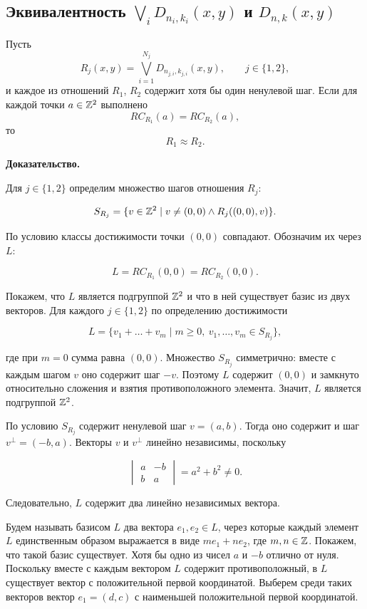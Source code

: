 \subsection{Эквивалентность $\bigvee \limits_{i} D_{n_i, k_i}(x,y)$ и $D_{n,k}(x,y)$}

\begin{namedLemma}
    \label{lemm:RCtoR}
    Пусть
    $$R_j(x,y)=\bigvee\limits_{i=1}^{N_j}D_{n_{j,i},k_{j,i}}(x,y),
    \qquad j\in\{1,2\},$$
    и каждое из отношений $R_1$, $R_2$ содержит хотя бы один ненулевой шаг.
    Если для каждой точки $a\in\mathbb{Z}^2$ выполнено
    $$RC_{R_1}(a)=RC_{R_2}(a),$$
    то
    $$R_1 \approx R_2.$$
\end{namedLemma}

\textbf{Доказательство.}

Для $j\in\{1,2\}$ определим множество шагов отношения $R_j$:

$$S_{R_j}=\{v\in\mathbb{Z}^2\mid v\ne(0,0)\land R_j((0,0),v)\}.$$

По условию классы достижимости точки $(0,0)$ совпадают. Обозначим их через
$L$:

$$L=RC_{R_1}(0,0)=RC_{R_2}(0,0).$$

Покажем, что $L$ является подгруппой $\mathbb{Z}^2$ и что в ней существует базис
из двух векторов. Для каждого $j\in\{1,2\}$ по определению достижимости

$$
L=
\{v_1+\dots+v_m\mid m\geq0,\ v_1,\dots,v_m\in S_{R_j}\},
$$

где при $m=0$ сумма равна $(0,0)$. Множество $S_{R_j}$ симметрично: вместе
с каждым шагом $v$ оно содержит шаг $-v$. Поэтому $L$ содержит $(0,0)$ и
замкнуто относительно сложения и взятия противоположного элемента. Значит,
$L$ является подгруппой $\mathbb{Z}^2$.

По условию $S_{R_j}$ содержит ненулевой шаг $v=(a,b)$. Тогда оно содержит и
шаг $v^\perp=(-b,a)$. Векторы $v$ и $v^\perp$ линейно независимы, поскольку

$$
\begin{vmatrix}
a&-b\\
b&a
\end{vmatrix}
=a^2+b^2\ne0.
$$

Следовательно, $L$ содержит два линейно независимых вектора.

Будем называть базисом $L$ два вектора $e_1,e_2\in L$, через которые каждый
элемент $L$ единственным образом выражается в виде $me_1+ne_2$, где
$m,n\in\mathbb{Z}$. Покажем, что такой базис существует. Хотя бы одно из чисел
$a$ и $-b$ отлично от нуля. Поскольку вместе с каждым вектором $L$ содержит
противоположный, в $L$ существует вектор с положительной первой координатой.
Выберем среди таких векторов вектор $e_1=(d,c)$ с наименьшей положительной
первой координатой.

